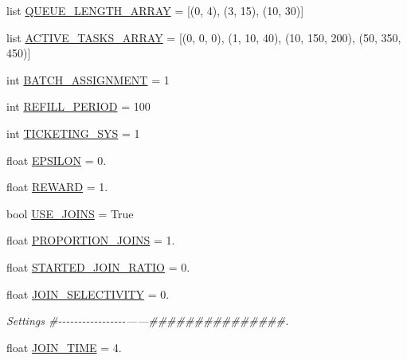 \begin{DoxyCompactItemize}
\item 
list \hyperlink{namespacedynamicfilterapp_1_1toggles_af8d4fe75258dd9f8b4c8cdb1b5b68ad1}{Q\+U\+E\+U\+E\+\_\+\+L\+E\+N\+G\+T\+H\+\_\+\+A\+R\+R\+AY} = \mbox{[}(0, 4), (3, 15), (10, 30)\mbox{]}
\item 
list \hyperlink{namespacedynamicfilterapp_1_1toggles_a8f7b1e7beea29c74a7defab7d44ef294}{A\+C\+T\+I\+V\+E\+\_\+\+T\+A\+S\+K\+S\+\_\+\+A\+R\+R\+AY} = \mbox{[}(0, 0, 0), (1, 10, 40), (10, 150, 200), (50, 350, 450)\mbox{]}
\item 
int \hyperlink{namespacedynamicfilterapp_1_1toggles_ab1f6b66c3fc1afbd280b14695b54f33f}{B\+A\+T\+C\+H\+\_\+\+A\+S\+S\+I\+G\+N\+M\+E\+NT} = 1
\item 
int \hyperlink{namespacedynamicfilterapp_1_1toggles_a26c4f956b0a9438426925bee66b89a2b}{R\+E\+F\+I\+L\+L\+\_\+\+P\+E\+R\+I\+OD} = 100
\item 
int \hyperlink{namespacedynamicfilterapp_1_1toggles_a4efd3667e6643a4cd2b96c4e647fa2f7}{T\+I\+C\+K\+E\+T\+I\+N\+G\+\_\+\+S\+YS} = 1
\item 
float \hyperlink{namespacedynamicfilterapp_1_1toggles_a5f5369d7244632ac071379fbb460c8fe}{E\+P\+S\+I\+L\+ON} = 0.
\item 
float \hyperlink{namespacedynamicfilterapp_1_1toggles_a058a8495c920cb75e731931532524c19}{R\+E\+W\+A\+RD} = 1.
\item 
bool \hyperlink{namespacedynamicfilterapp_1_1toggles_a5740b01cf5a5537c768820e758a2cedf}{U\+S\+E\+\_\+\+J\+O\+I\+NS} = True
\item 
float \hyperlink{namespacedynamicfilterapp_1_1toggles_a943c36531eb68e7cbe2ee3ac0010f01f}{P\+R\+O\+P\+O\+R\+T\+I\+O\+N\+\_\+\+J\+O\+I\+NS} = 1.
\item 
float \hyperlink{namespacedynamicfilterapp_1_1toggles_aad6ab6da90f08d82dc469acf948aa64a}{S\+T\+A\+R\+T\+E\+D\+\_\+\+J\+O\+I\+N\+\_\+\+R\+A\+T\+IO} = 0.
\item 
float \hyperlink{namespacedynamicfilterapp_1_1toggles_aa2664d840db6239eb83fc3ddbd95e2f6}{J\+O\+I\+N\+\_\+\+S\+E\+L\+E\+C\+T\+I\+V\+I\+TY} = 0.
\begin{DoxyCompactList}\small\item\em Settings \#-\/-\/-\/-\/-\/-\/-\/-\/-\/-\/-\/-\/-\/-\/-\/-\/-\/------\#\#\#\#\#\#\#\#\#\#\#\#\#\#\#. \end{DoxyCompactList}\item 
float \hyperlink{namespacedynamicfilterapp_1_1toggles_aa58cd9d1d38e3a163d25193a2b16e365}{J\+O\+I\+N\+\_\+\+T\+I\+ME} = 4.
\item 

\end{DoxyCompactItemize}
